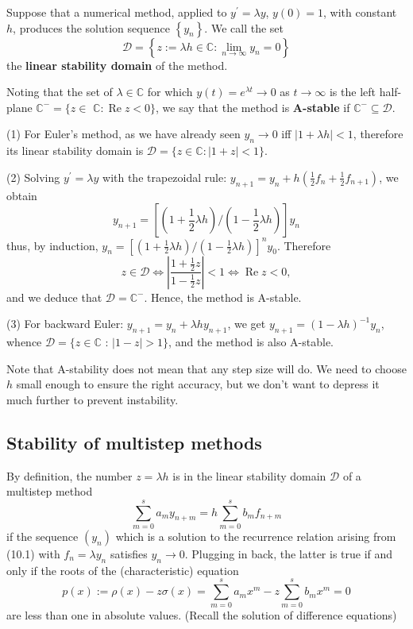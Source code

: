 \documentclass[a4paper]{article}
\begin{document}
\begin{definition}
    Suppose that a numerical method, applied to $y^{\prime}=\lambda y$, $y(0)=1$, with constant $h$, produces the solution sequence $\left\{y_n\right\}$. We call the set
\[
\mathcal{D}=\left\{z:=\lambda h \in \mathbb{C}: \lim _{n \rightarrow \infty} y_n=0\right\}
\]
the \textbf{linear stability domain} of the method.

Noting that the set of $\lambda \in \mathbb{C}$ for which $y(t)=e^{\lambda t} \rightarrow 0$ as $t \rightarrow \infty$ is the left half-plane $\mathbb{C}^{-}=\{z \in$ $\mathbb{C}: \operatorname{Re} z<0\}$, we say that the method is \textbf{A-stable} if $\mathbb{C}^{-} \subseteq \mathcal{D}$.
\end{definition}

\begin{example}
    (1) For Euler's method, as we have already seen $y_n \rightarrow 0$ iff $|1+\lambda h|<1$, therefore its linear stability domain is $\mathcal{D}=\{z \in \mathbb{C}:|1+z|<1\}$.

(2) Solving $y^{\prime}=\lambda y$ with the trapezoidal rule: $y_{n+1}=y_n+h\left(\frac{1}{2} f_n+\frac{1}{2} f_{n+1}\right)$, we obtain
\[
    y_{n+1}=\left[\left(1+\frac{1}{2} \lambda h\right) \bigg/\left(1-\frac{1}{2} \lambda h\right)\right] y_n
\]
thus, by induction, $y_n=\left[\left(1+\frac{1}{2} \lambda h\right) /\left(1-\frac{1}{2} \lambda h\right)\right]^n y_0$. Therefore
\[
z \in \mathcal{D}  \iff \left|\frac{1+\frac{1}{2} z}{1-\frac{1}{2} z}\right|<1  \iff  \operatorname{Re} z<0,
\]
and we deduce that $\mathcal{D}=\mathbb{C}^{-}$. Hence, the method is A-stable.

(3) For backward Euler: $y_{n+1}=y_n+\lambda h y_{n+1}$, we get $y_{n+1}=(1-\lambda h)^{-1} y_n$, whence $\mathcal{D}=\{z \in \mathbb{C}$ : $|1-z|>1\}$, and the method is also A-stable.
\end{example}
Note that A-stability does not mean that any step size will do. We need to choose $h$ small enough to ensure the right accuracy, but we don't want to depress it much further to prevent instability.

\subsection{Stability of multistep methods}
By definition, the number $z=\lambda h$ is in the linear stability domain $\mathcal{D}$ of a multistep method
\begin{equation}
    \sum_{m=0}^s a_m y_{n+m}=h \sum_{m=0}^s b_m f_{n+m}
\end{equation}
if the sequence $\left(y_n\right)$ which is a solution to the recurrence relation arising from (10.1) with $f_n=\lambda y_n$ satisfies $y_n \rightarrow 0$. Plugging in back, the latter is true if and only if the roots of the (characteristic) equation
\begin{equation}
    p(x):=\rho(x)-z \sigma(x)=\sum_{m=0}^s a_m x^m-z \sum_{m=0}^s b_m x^m=0
\end{equation}
are less than one in absolute values. (Recall the solution of difference equations)
\end{document}
